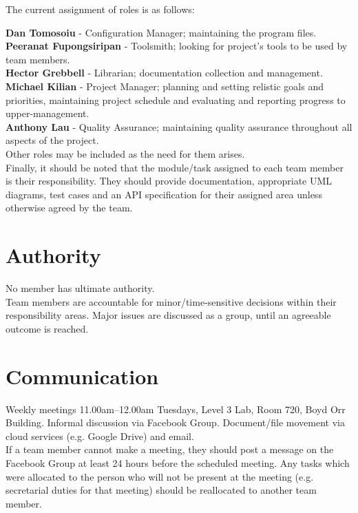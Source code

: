 \documentclass{l3deliverable}
\begin{document}
The current assignment of roles is as follows:

{\bf Dan Tomosoiu} - Configuration Manager; maintaining the program files.\\
{\bf Peeranat Fupongsiripan} - Toolsmith; looking for project's tools to be used by team members.\\
{\bf Hector Grebbell} - Librarian; documentation collection and management.\\
{\bf Michael Kilian} - Project Manager; planning and setting relistic goals and priorities, maintaining project schedule and evaluating and reporting progress to upper-management.\\
{\bf Anthony Lau} - Quality Assurance; maintaining quality assurance throughout all aspects of the project.\\


Other roles may be included as the need for them arises.\\

Finally, it should be noted that the module/task assigned to each team member is their responsibility. They should provide documentation, appropriate UML diagrams, test cases and an API specification for their assigned area unless otherwise agreed by the team. 



\section{Authority}

No member has ultimate authority. \\
Team members are accountable for minor/time-sensitive decisions within their responsibility areas.
Major issues are discussed as a group, until an agreeable outcome is reached.


\section{Communication}

Weekly meetings 11.00am–12.00am Tuesdays, Level 3 Lab, Room 720, Boyd Orr Building.
Informal discussion via Facebook Group.
Document/file movement via cloud services (e.g. Google Drive) and email.
\\
If a team member cannot make a meeting, they should post a message on the Facebook Group at least 24 hours before the scheduled meeting. Any tasks which were allocated to the person who will not be present at the meeting (e.g. secretarial duties for that meeting) should be reallocated to another team member.
\end{document}
